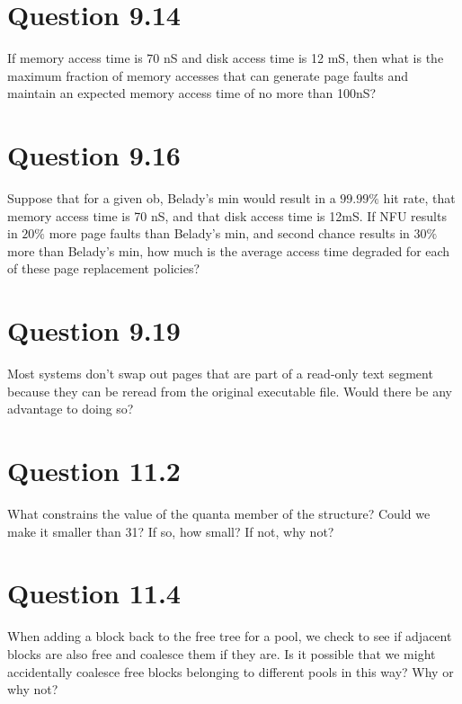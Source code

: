 \documentclass{article}
\begin{document}
\section*{Question 9.14}
If memory access time is 70 nS and disk access time is 12 mS, then what is the maximum fraction of memory accesses that can generate page faults and maintain an expected memory access time of no more than 100nS?

\section*{Question 9.16}
Suppose that for a given ob, Belady's min would result in a $99.99\%$ hit rate, that memory access time is 70 nS, and that disk access time is 12mS.
If NFU results in $20\%$ more page faults than Belady's min, and second chance results in $30\%$ more than Belady's min, how much is the average access time degraded for each of these page replacement policies?

\section*{Question 9.19}
Most systems don't swap out pages that are part of a read-only text segment because they can be reread from the original executable file.
Would there be any advantage to doing so?

\section*{Question 11.2}
What constrains the value of the quanta member of the  structure? Could we make it smaller than 31?
If so, how small?
If not, why not?

\section*{Question 11.4}
When adding a block back to the free tree for a pool, we check to see if adjacent blocks are also free and coalesce them if they are.
Is it possible that we might accidentally coalesce free blocks belonging to different pools in this way?
Why or why not?
\end{document}
